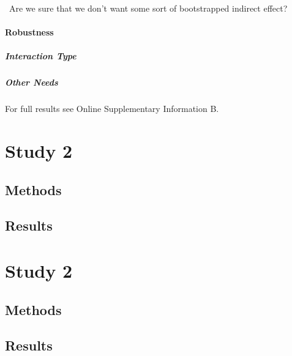 \faQuestionCircle~Are we sure that we don't want some sort of
bootstrapped indirect effect?

\paragraph{Robustness}

\subparagraph{Interaction Type}

\subparagraph{Other Needs}

For full results see Online Supplementary Information B.

\section{Study 2}

\subsection{Methods}

\subsection{Results}

\section{Study 2}

\subsection{Methods}

\subsection{Results}
